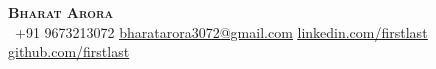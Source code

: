 \begin{center}
    \textbf{\Huge \scshape Bharat Arora} \\ \vspace{1pt}
     \ \small +91 9673213072 \quad
    \href{mailto:fibharatarora3072stlast@gmail.com}{ \underline{bharatarora3072@gmail.com}} \quad
    \href{https://www.linkedin.com/in/}{ \underline{linkedin.com/firstlast}} \quad
    \href{https://github.com/}{ \underline{github.com/firstlast}}
\end{center}